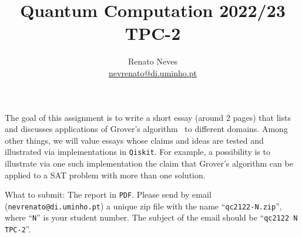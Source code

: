\documentclass[a4paper, 11pt]{article}
\date{}
\theoremstyle{definition}
\begin{document}
\allowdisplaybreaks[2]
\title{Quantum Computation 2022/23\\ \small{TPC-2}}
\author{Renato Neves \\ \scriptsize
  \href{mailto:nevrenato@di.uminho.pt}{nevrenato@di.uminho.pt}}
\maketitle

\noindent
The goal of this assignment is to write a short essay (around 2 pages) that
lists and discusses applications of Grover's algorithm~\cite{nielsen16} to
different domains. Among other things, we will value essays whose claims and
ideas are tested and illustrated via implementations in \texttt{Qiskit}. For
example, a possibility is to illustrate via one such implementation the claim
that Grover's algorithm can be applied to a \textsc{SAT} problem with more than
one solution.

\begin{mdframed}
  What to submit: The report in \texttt{PDF}. Please send by email
  (\texttt{nevrenato@di.uminho.pt}) a unique zip file with the name
  ``\texttt{qc2122-N.zip}'', where ``\texttt{N}'' is your student number.  The
  subject of the email should be ``\texttt{qc2122 N TPC-2}''.
\end{mdframed}





\end{document}

